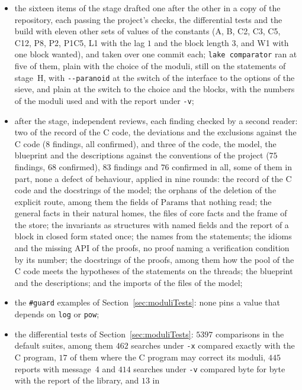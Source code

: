 \begin{itemize}
  \item the sixteen items of the stage drafted one after the other in a copy of the repository, each
    passing the project's checks, the differential tests and the build with eleven other sets of
    values of the constants (A, B, C2, C3, C5, C12, P8, P2, P1C5, L1 with the lag $1$ and the block
    length $3$, and W1 with one block wanted), and taken over one commit each;
    \verb|lake comparator| ran at five of them, plain with the choice of the moduli, still on the
    statements of stage~H, with \verb|--paranoid| at the switch of the interface to the options of
    the sieve, and plain at the switch to the choice and the blocks, with the numbers of the moduli
    used and with the report under \verb|-v|;
  \item after the stage, independent reviews, each finding checked by a second reader: two of the
    record of the C code, the deviations and the exclusions against the C code ($8$ findings, all
    confirmed), and three of the code, the model, the blueprint and the descriptions against the
    conventions of the project ($75$ findings, $68$ confirmed), $83$ findings and $76$ confirmed in
    all, some of them in part, none a defect of behaviour, applied in nine rounds: the record of the
    C code and the docstrings of the model; the orphans of the deletion of the explicit route, among
    them the fields of $\mathrm{Params}$ that nothing read; the general facts in their natural
    homes, the files of core facts and the frame of the store; the invariants as structures with
    named fields and the report of a block in closed form stated once; the names from the
    statements; the idioms and the missing API of the proofs, no proof naming a verification
    condition by its number; the docstrings of the proofs, among them how the pool of the C code
    meets the hypotheses of the statements on the threads; the blueprint and the descriptions; and
    the imports of the files of the model;
  \item the \verb|#guard| examples of Section~\ref{sec:moduliTests}: none pins a value that depends
    on \verb|log| or \verb|pow|;
  \item the differential tests of Section~\ref{sec:moduliTests}: $5397$ comparisons in the default
    suites, among them $462$ searches under \verb|-x| compared exactly with the C program, $17$ of
    them where the C program may correct its moduli, $445$ reports with message~4 and $414$ searches
    under \verb|-v| compared byte for byte with the report of the library, and $13$ in

\end{itemize}
